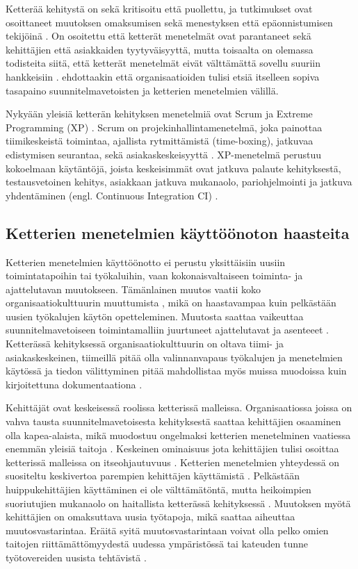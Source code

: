 Ketterää kehitystä on sekä kritisoitu että puollettu, ja tutkimukset ovat
osoittaneet muutoksen omaksumisen sekä menestyksen että epäonnistumisen
tekijöinä . On osoitettu että ketterät menetelmät ovat
parantaneet sekä kehittäjien että asiakkaiden tyytyväisyyttä, mutta toisaalta on
olemassa todisteita siitä, että ketterät menetelmät eivät välttämättä sovellu
suuriin hankkeisiin .  ehdottaakin että
organisaatioiden tulisi etsiä itselleen sopiva tasapaino suunnitelmavetoisten ja
ketterien menetelmien välillä.

Nykyään yleisiä ketterän kehityksen menetelmiä ovat Scrum ja Extreme Programming
(XP) . Scrum on projekinhallintamenetelmä, joka painottaa
tiimikeskeistä toimintaa, ajallista rytmittämistä (time-boxing), jatkuvaa
edistymisen seurantaa, sekä asiakaskeskeisyyttä .
XP-menetelmä perustuu kokoelmaan käytäntöjä, joista keskeisimmät ovat jatkuva
palaute kehityksestä, testausvetoinen kehitys, asiakkaan jatkuva mukanaolo,
pariohjelmointi ja jatkuva yhdentäminen (engl. Continuous Integration
CI) .

\subsection{Ketterien menetelmien käyttöönoton haasteita}

Ketterien menetelmien käyttöönotto ei perustu yksittäisiin uusiin
toimintatapoihin tai työkaluihin, vaan kokonaisvaltaiseen toiminta- ja
ajattelutavan muutokseen. Tämänlainen muutos vaatii koko organisaatiokulttuurin
muuttumista , mikä on haastavampaa kuin pelkästään uusien
työkalujen käytön opetteleminen. Muutosta saattaa vaikeuttaa
suunnitelmavetoiseen toimintamalliin juurtuneet ajattelutavat ja asenteeet
. Ketterässä kehityksessä organisaatiokulttuurin
on oltava tiimi- ja asiakaskeskeinen, tiimeillä pitää olla valinnanvapaus
työkalujen ja menetelmien käytössä ja tiedon välittyminen pitää mahdollistaa
myös muissa muodoissa kuin kirjoitettuna dokumentaationa .

Kehittäjät ovat keskeisessä roolissa ketterissä malleissa. Organisaatiossa
joissa on vahva tausta suunnitelmavetoisesta kehityksestä saattaa kehittäjien
osaaminen olla kapea-alaista, mikä muodostuu ongelmaksi ketterien menetelminen
vaatiessa enemmän yleisiä taitoja . Keskeinen ominaisuus
jota kehittäjien tulisi osoittaa ketterissä malleissa on itseohjautuvuus
. Ketterien menetelmien yhteydessä on suositeltu keskivertoa
parempien kehittäjen käyttämistä . Pelkästään
huippukehittäjien käyttäminen ei ole välttämätöntä, mutta heikoimpien
suoriutujien mukanaolo on haitallista ketterässä kehityksessä
. Muutoksen myötä kehittäjien on omaksuttava uusia
työtapoja, mikä saattaa aiheuttaa muutosvastarintaa. Eräitä syitä
muutosvastarintaan voivat olla pelko omien taitojen riittämättömyydestä uudessa
ympäristössä tai kateuden tunne työtovereiden uusista tehtävistä
.

